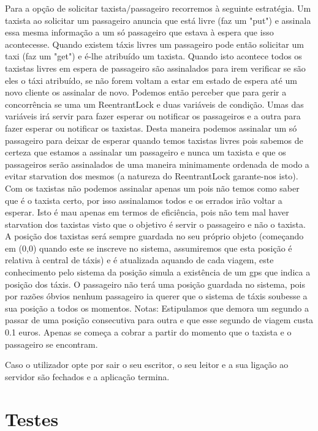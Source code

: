 Para a opção de solicitar taxista/passageiro recorremos à seguinte estratégia. Um taxista ao solicitar um passageiro anuncia que está livre (faz um "put") e assinala essa mesma informação a um só passageiro que estava à espera que isso acontecesse. Quando existem táxis livres um passageiro pode então solicitar um taxi (faz um "get") e é-lhe atribuído um taxista. Quando isto acontece todos os taxistas livres em espera de passageiro são assinalados para irem verificar se são eles o táxi atribuído, se não forem voltam a estar em estado de espera até um novo cliente os assinalar de novo. Podemos então perceber que para gerir a concorrência se uma um ReentrantLock e duas variáveis de condição. Umas das variáveis irá servir para fazer esperar ou notificar os passageiros e a outra para fazer esperar ou notificar os taxistas. Desta maneira podemos assinalar um só passageiro para deixar de esperar quando temos taxistas livres pois sabemos de certeza que estamos a assinalar um passageiro e nunca um taxista e que os passageiros serão assinalados de uma maneira minimamente ordenada de modo a evitar starvation dos mesmos (a natureza do ReentrantLock garante-nos isto). Com os taxistas não podemos assinalar apenas um pois não temos como saber que é o taxista certo, por isso assinalamos todos e os errados irão voltar a esperar. Isto é mau apenas em termos de eficiência, pois não tem mal haver starvation dos taxistas visto que o objetivo é servir o passageiro e não o taxista. A posição dos taxistas será sempre guardada no seu próprio objeto (começando em (0,0) quando este se inscreve no sistema, assumiremos que esta posição é relativa à central de táxis) e é atualizada aquando de cada viagem, este conhecimento pelo sistema da posição simula a existência de um gps que indica a posição dos táxis. O passageiro não terá uma posição guardada no sistema, pois por razões óbvios nenhum passageiro ia querer que o sistema de táxis soubesse a sua posição a todos os momentos.
Notas: Estipulamos que demora um segundo a passar de uma posição consecutiva para outra e que esse segundo de viagem custa 0.1 euros. Apenas se começa a cobrar a partir do momento que o taxista e o passageiro se encontram. 

Caso o utilizador opte por sair o seu escritor, o seu leitor e a sua ligação ao servidor são fechados e a aplicação termina.


\section{Testes}

